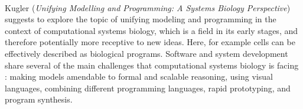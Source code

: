 

\ \hline \ %

Kugler
\cite{isola-2016-kugler}
({\em Unifying Modelling and Programming: A Systems Biology Perspective})
suggests to explore the topic of unifying modeling and programming
in the context of computational systems biology, which is a field 
in its early stages, and therefore potentially more receptive to 
new ideas. Here, for example cells
can be effectively described as biological programs.
Software and system development share several of the main 
challenges that computational systems
biology is facing : 
making models amendable to formal and scalable reasoning,
using visual languages, combining different programming
languages, rapid prototyping, and program synthesis.

\done{}
